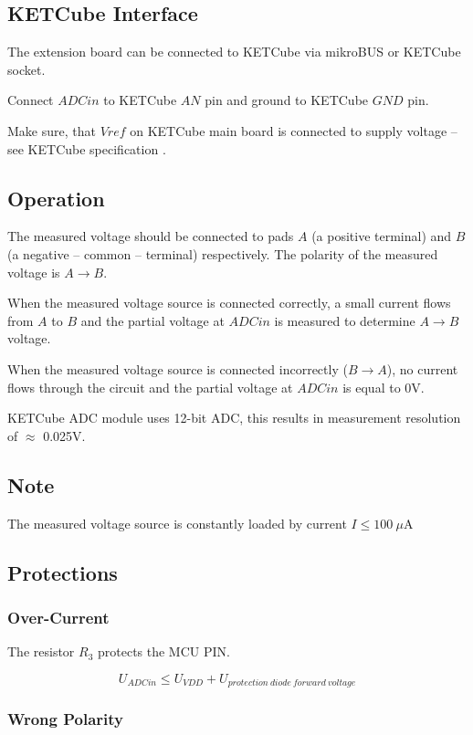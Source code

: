 \subsection{KETCube Interface}
  The extension board can be connected to KETCube via mikroBUS or KETCube socket. 
  
  Connect $ADCin$ to KETCube $AN$ pin and ground to KETCube $GND$ pin.
  
  Make sure, that $Vref$ on KETCube main board is connected to supply voltage -- see KETCube specification \cite{ZCU:KETCube:05-2018}.
  
\subsection{Operation}
  The measured voltage should be connected to pads $A$ (a positive terminal) and $B$ (a negative -- common -- terminal) respectively. The polarity of the measured voltage is $A \rightarrow B$. 

  When the measured voltage source is connected correctly, a small current flows from $A$ to $B$ and the partial voltage at $ADCin$ is measured to determine $A \rightarrow B$ voltage.

  When the measured voltage source is connected incorrectly ($B \rightarrow A$), no current flows through the circuit and the partial voltage at $ADCin$ is equal to 0V.
  
  KETCube ADC module uses 12-bit ADC, this results in measurement resolution of $\approx$ 0.025V.

\subsection*{Note}
  The measured voltage source is constantly loaded by current $I \leq 100 ~\mu$A
  
\subsection{Protections}
\subsubsection*{Over-Current}
  The resistor $R_3$ protects the MCU PIN.

\begin{equation}
  U_{ADCin} \leq U_{VDD} + U_{protection~diode~forward~voltage}
\end{equation}
  
\subsubsection*{Wrong Polarity}


